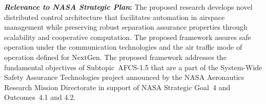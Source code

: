 \documentclass[letter,onecolumn,12pt]{aiaa-tc}
\newcommand{\1}{1_n}
\begin{document}

\medskip

\textbf{\emph{Relevance to NASA Strategic Plan}:} The proposed research develops novel distributed control
architecture that facilitates automation in airspace management while preserving robust separation assurance
properties through scalability and cooperative computation. The proposed framework  assures safe operation under the communication technologies  and the air traffic mode of operation defined for NextGen.
The proposed framework addresses the fundamental objectives of Subtopic~\mbox{AFCS-1.5} that are a part of the System-Wide Safety Assurance Technologies project  announced by the NASA Aeronautics Research Mission Directorate in support of NASA Strategic Goal~4 and Outcomes~4.1 and 4.2.




\clearpage
\thispagestyle{empty}
\tableofcontents



\clearpage
\pagestyle{plain}

\end{document}
